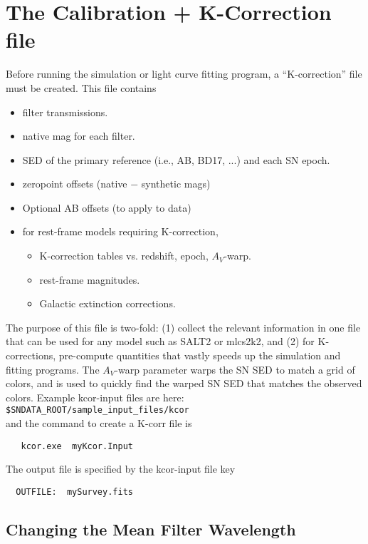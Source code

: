 \documentclass[12pt]{article}
\begin{document}
{   \section{The Calibration + K-Correction file}
   \label{sec:kcorFile}

Before running the simulation or light curve fitting program,
a ``K-correction'' file must be created.
This file contains 
\begin{itemize}[noitemsep]
  \item filter transmissions.
  \item native mag for each filter.
  \item SED of the primary reference (i.e., AB, BD17, ...)
           and each SN epoch.
  \item zeropoint offsets (native $-$ synthetic mags)
  \item Optional AB offsets (to apply to data)
  \item for rest-frame models requiring K-correction,
  \begin{itemize}[noitemsep]
    \item K-correction tables vs. 
             redshift, epoch, $A_V$-warp.
    \item rest-frame magnitudes.
    \item Galactic extinction corrections.
  \end{itemize}
\end{itemize}
The purpose of this file is two-fold:
(1) collect the relevant information in one file
that can be used for any model such as  SALT2 or mlcs2k2, and
(2) for K-corrections, pre-compute quantities that vastly
speeds up the simulation and fitting programs.
The $A_V$-warp parameter warps the SN SED to match a grid
of colors, and is used to quickly find the warped SN SED
that matches the observed colors.
Example kcor-input files are here:
   {\tt \$SNDATA\_ROOT/sample\_input\_files/kcor} \\
%
and the command to create a K-corr file is
\begin{verbatim}
   kcor.exe  myKcor.Input
\end{verbatim}
%
The output file is specified by the kcor-input file key
%
\begin{verbatim}
  OUTFILE:  mySurvey.fits
\end{verbatim}


\subsection{Changing the Mean Filter Wavelength}

}
\end{document}
